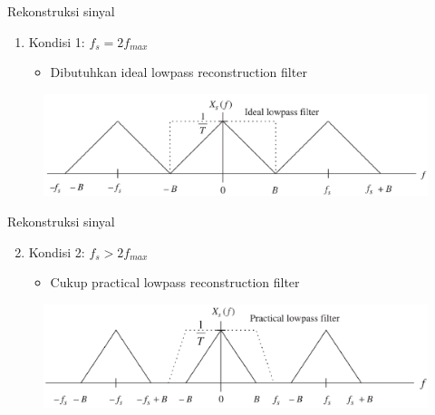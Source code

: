 \documentclass[pdflatex,compress,mathserif]{beamer}
\begin{document}
\begin{frame}{Rekonstruksi sinyal}
    \begin{enumerate}
        \item Kondisi 1: $f_s = 2f_{max}$
        \begin{itemize}
            \item Dibutuhkan ideal lowpass reconstruction filter
        \end{itemize}
    \end{enumerate}
    \begin{figure}
        \includegraphics[width=\linewidth]{img/img15.png}
    \end{figure}
\end{frame}

\begin{frame}{Rekonstruksi sinyal}
    \begin{enumerate}
        \setcounter{enumi}{1}
        \item Kondisi 2: $f_s > 2f_{max}$
        \begin{itemize}
            \item Cukup practical lowpass reconstruction filter
        \end{itemize}
    \end{enumerate}
    \begin{figure}
        \includegraphics[width=\linewidth]{img/img16.png}
    \end{figure}
\end{frame}
\end{document}
